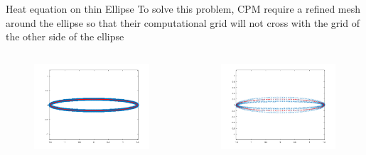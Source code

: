 \documentclass{beamer}
\begin{document}
\begin{frame}{Heat equation on thin Ellipse}
    To solve this problem, CPM require a refined mesh around the ellipse so that their computational grid will not cross with the grid of the other side of the ellipse
    \begin{columns}
        \begin{figure}
            \centering
            \includegraphics[width=1\textwidth]{UBC_IAM_5min_talk/Figures/heat_ellipse/heat_ellipse_CPM_refinedgrid.png}
        \end{figure}
        \pause
        \begin{figure}
            \centering
            \includegraphics[width=1\textwidth]{UBC_IAM_5min_talk/Figures/heat_ellipse/heat_ellipse_RBFCPM_ellipticgrid.png}
        \end{figure}
    \end{columns}
\end{frame}
\end{document}
